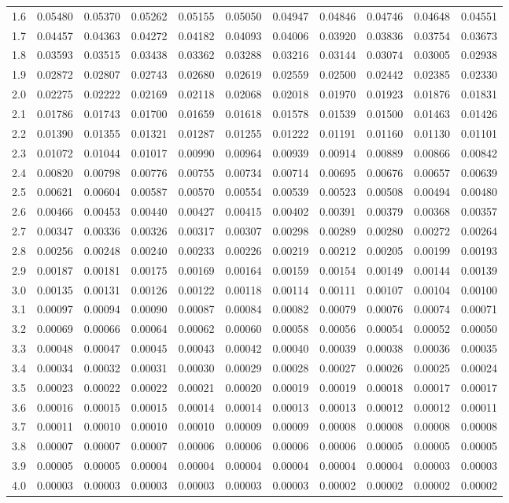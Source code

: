 \documentclass[]{book}
\theoremstyle{plain}
\theoremstyle{definition}
\theoremstyle{definition} %
\begin{document}
\begin{longtable}[]{@{}ccccccccccc@{}}
1.6 & 0.05480 & 0.05370 & 0.05262 & 0.05155 & 0.05050 & 0.04947 &
0.04846 & 0.04746 & 0.04648 & 0.04551\tabularnewline
1.7 & 0.04457 & 0.04363 & 0.04272 & 0.04182 & 0.04093 & 0.04006 &
0.03920 & 0.03836 & 0.03754 & 0.03673\tabularnewline
1.8 & 0.03593 & 0.03515 & 0.03438 & 0.03362 & 0.03288 & 0.03216 &
0.03144 & 0.03074 & 0.03005 & 0.02938\tabularnewline
1.9 & 0.02872 & 0.02807 & 0.02743 & 0.02680 & 0.02619 & 0.02559 &
0.02500 & 0.02442 & 0.02385 & 0.02330\tabularnewline
2.0 & 0.02275 & 0.02222 & 0.02169 & 0.02118 & 0.02068 & 0.02018 &
0.01970 & 0.01923 & 0.01876 & 0.01831\tabularnewline
2.1 & 0.01786 & 0.01743 & 0.01700 & 0.01659 & 0.01618 & 0.01578 &
0.01539 & 0.01500 & 0.01463 & 0.01426\tabularnewline
2.2 & 0.01390 & 0.01355 & 0.01321 & 0.01287 & 0.01255 & 0.01222 &
0.01191 & 0.01160 & 0.01130 & 0.01101\tabularnewline
2.3 & 0.01072 & 0.01044 & 0.01017 & 0.00990 & 0.00964 & 0.00939 &
0.00914 & 0.00889 & 0.00866 & 0.00842\tabularnewline
2.4 & 0.00820 & 0.00798 & 0.00776 & 0.00755 & 0.00734 & 0.00714 &
0.00695 & 0.00676 & 0.00657 & 0.00639\tabularnewline
2.5 & 0.00621 & 0.00604 & 0.00587 & 0.00570 & 0.00554 & 0.00539 &
0.00523 & 0.00508 & 0.00494 & 0.00480\tabularnewline
2.6 & 0.00466 & 0.00453 & 0.00440 & 0.00427 & 0.00415 & 0.00402 &
0.00391 & 0.00379 & 0.00368 & 0.00357\tabularnewline
2.7 & 0.00347 & 0.00336 & 0.00326 & 0.00317 & 0.00307 & 0.00298 &
0.00289 & 0.00280 & 0.00272 & 0.00264\tabularnewline
2.8 & 0.00256 & 0.00248 & 0.00240 & 0.00233 & 0.00226 & 0.00219 &
0.00212 & 0.00205 & 0.00199 & 0.00193\tabularnewline
2.9 & 0.00187 & 0.00181 & 0.00175 & 0.00169 & 0.00164 & 0.00159 &
0.00154 & 0.00149 & 0.00144 & 0.00139\tabularnewline
3.0 & 0.00135 & 0.00131 & 0.00126 & 0.00122 & 0.00118 & 0.00114 &
0.00111 & 0.00107 & 0.00104 & 0.00100\tabularnewline
3.1 & 0.00097 & 0.00094 & 0.00090 & 0.00087 & 0.00084 & 0.00082 &
0.00079 & 0.00076 & 0.00074 & 0.00071\tabularnewline
3.2 & 0.00069 & 0.00066 & 0.00064 & 0.00062 & 0.00060 & 0.00058 &
0.00056 & 0.00054 & 0.00052 & 0.00050\tabularnewline
3.3 & 0.00048 & 0.00047 & 0.00045 & 0.00043 & 0.00042 & 0.00040 &
0.00039 & 0.00038 & 0.00036 & 0.00035\tabularnewline
3.4 & 0.00034 & 0.00032 & 0.00031 & 0.00030 & 0.00029 & 0.00028 &
0.00027 & 0.00026 & 0.00025 & 0.00024\tabularnewline
3.5 & 0.00023 & 0.00022 & 0.00022 & 0.00021 & 0.00020 & 0.00019 &
0.00019 & 0.00018 & 0.00017 & 0.00017\tabularnewline
3.6 & 0.00016 & 0.00015 & 0.00015 & 0.00014 & 0.00014 & 0.00013 &
0.00013 & 0.00012 & 0.00012 & 0.00011\tabularnewline
3.7 & 0.00011 & 0.00010 & 0.00010 & 0.00010 & 0.00009 & 0.00009 &
0.00008 & 0.00008 & 0.00008 & 0.00008\tabularnewline
3.8 & 0.00007 & 0.00007 & 0.00007 & 0.00006 & 0.00006 & 0.00006 &
0.00006 & 0.00005 & 0.00005 & 0.00005\tabularnewline
3.9 & 0.00005 & 0.00005 & 0.00004 & 0.00004 & 0.00004 & 0.00004 &
0.00004 & 0.00004 & 0.00003 & 0.00003\tabularnewline
4.0 & 0.00003 & 0.00003 & 0.00003 & 0.00003 & 0.00003 & 0.00003 &
0.00002 & 0.00002 & 0.00002 & 0.00002\tabularnewline
\bottomrule
\end{longtable}
\end{document}
